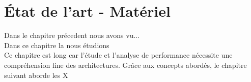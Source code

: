 

\chapter{État de l'art - Matériel}
\label{chap:sota:materiel}
\minitoc

Dans le chapitre précedent nous avons vu...\\
Dans ce chapitre la nous étudions\\
Ce chapitre est long car l'étude et l'analyse de performance nécessite une compréhension fine des architectures.
Grâce aux concepts abordés, le chapitre suivant aborde les X\\














